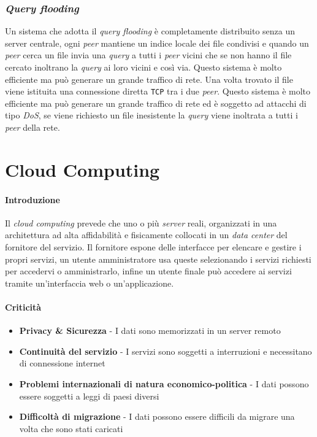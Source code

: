             \subsubsection{\textit{Query flooding}}
                Un sistema che adotta il \textit{query flooding} è completamente distribuito senza un server centrale, ogni \textit{peer} mantiene un indice locale dei file condivisi e quando un \textit{peer} cerca un file invia una \textit{query} a tutti i \textit{peer} vicini che se non hanno il file cercato inoltrano la \textit{query} ai loro vicini e così via. Questo sistema è molto efficiente ma può generare un grande traffico di rete. Una volta trovato il file viene istituita una connessione diretta \texttt{TCP} tra i due \textit{peer}. Questo sistema è molto efficiente ma può generare un grande traffico di rete ed è soggetto ad attacchi di tipo \textit{DoS}, se viene richiesto un file inesistente la \textit{query} viene inoltrata a tutti i \textit{peer} della rete.
\section{Cloud Computing}
    \paragraph{Introduzione} Il \textit{cloud computing} prevede che uno o più \textit{server} reali, organizzati in una architettura ad alta affidabilità e fisicamente collocati in un \textit{data center} del fornitore del servizio. Il fornitore espone delle interfacce per elencare e gestire i propri servizi, un utente amministratore usa queste selezionando i servizi richiesti per accedervi o amministrarlo, infine un utente finale può accedere ai servizi tramite un'interfaccia web o un'applicazione.
    \paragraph{Criticità}
        \begin{itemize}
            \item \textbf{Privacy \& Sicurezza} - I dati sono memorizzati in un server remoto
            \item \textbf{Continuità del servizio} - I servizi sono soggetti a interruzioni e necessitano di connessione internet
            \item \textbf{Problemi internazionali di natura economico-politica} - I dati possono essere soggetti a leggi di paesi diversi
            \item \textbf{Difficoltà di migrazione} - I dati possono essere difficili da migrare una volta che sono stati caricati
        \end{itemize}
